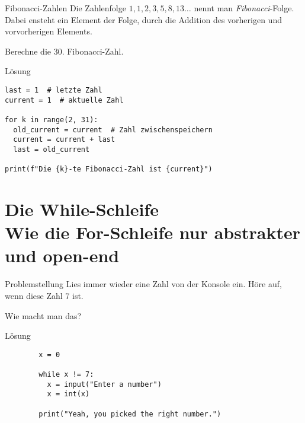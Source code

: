 \begin{fragile}
	
	
\begin{block}{Fibonacci-Zahlen}
\vspace{2pt}
Die Zahlenfolge $1,1,2,3,5,8,13\ldots$ nennt man \emph{Fibonacci}-Folge. Dabei ensteht ein Element der Folge, durch die Addition des vorherigen und vorvorherigen Elements. 

\vspace{1pt}

Berechne die 30. Fibonacci-Zahl.  
\end{block}
\vspace{12pt}
\begin{solutionblock}{Lösung}
\begin{verbatim}
last = 1  # letzte Zahl
current = 1  # aktuelle Zahl

for k in range(2, 31):
  old_current = current  # Zahl zwischenspeichern
  current = current + last
  last = old_current

print(f"Die {k}-te Fibonacci-Zahl ist {current}")
\end{verbatim}
\end{solutionblock}
	
\end{fragile}


\section{Die While-Schleife \\ \footnotesize Wie die For-Schleife nur abstrakter und open-end}

\begin{frame}
\begin{block}{Problemstellung}
	\vspace{2pt}
	Lies immer wieder eine Zahl von der Konsole ein. Höre auf, wenn diese Zahl 7 ist. 
	
	Wie macht man das? 
\end{block}
\end{frame}

\begin{fragile}
	
\begin{block}{Lösung}
		\vspace{2pt}
		
	\begin{verbatim}
		x = 0
		
		while x != 7: 
		  x = input("Enter a number")
		  x = int(x)
		  
		print("Yeah, you picked the right number.")
	\end{verbatim}
	
\end{block}
\end{fragile}


